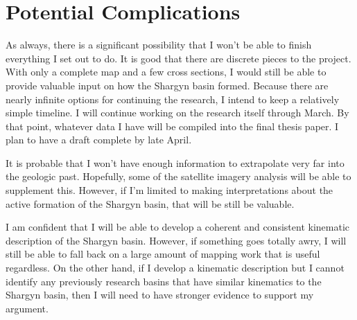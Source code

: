 \documentclass[10pt,a4paper]{article}
\begin{document}
\section*{Potential Complications}
	As always, there is a significant possibility that I won't be able to finish everything I set out to do. It is good that there are discrete pieces to the project. With only a complete map and a few cross sections, I would still be able to provide valuable input on how the Shargyn basin formed. Because there are nearly infinite options for continuing the research, I intend to keep a relatively simple timeline. I will continue working on the research itself through March. By that point, whatever data I have will be compiled into the final thesis paper. I plan to have a draft complete by late April. 

	It is probable that I won't have enough information to extrapolate very far into the geologic past. Hopefully, some of the satellite imagery analysis will be able to supplement this. However, if I'm limited to making interpretations about the active formation of the Shargyn basin, that will be still be valuable. 
	
	I am confident that I will be able to develop a coherent and consistent kinematic description of the Shargyn basin. However, if something goes totally awry, I will still be able to fall back on a large amount of mapping work that is useful regardless. On the other hand, if I develop a kinematic description but I cannot identify any previously research basins that have similar kinematics to the Shargyn basin, then I will need to have stronger evidence to support my argument.
	


\end{document}
